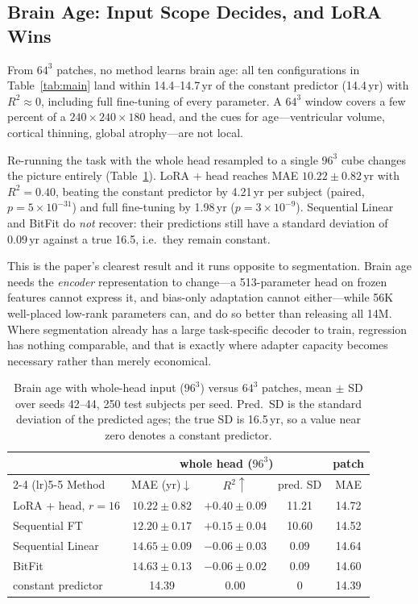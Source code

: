 \documentclass[journal,twoside,web]{ieeecolor}
\begin{document}
\subsection{Brain Age: Input Scope Decides, and LoRA Wins}
\label{sec:res_age}

From $64^3$ patches, no method learns brain age: all ten configurations in Table~\ref{tab:main} land within 14.4--14.7\,yr of the constant predictor (14.4\,yr) with $R^2\approx 0$, including full fine-tuning of every parameter. A $64^3$ window covers a few percent of a $240{\times}240{\times}180$ head, and the cues for age---ventricular volume, cortical thinning, global atrophy---are not local.

Re-running the task with the whole head resampled to a single $96^3$ cube changes the picture entirely (Table~\ref{tab:age}). LoRA + head reaches MAE $10.22\pm0.82$\,yr with $R^2=0.40$, beating the constant predictor by 4.21\,yr per subject (paired, $p=5{\times}10^{-31}$) and full fine-tuning by 1.98\,yr ($p=3{\times}10^{-9}$). Sequential Linear and BitFit do \emph{not} recover: their predictions still have a standard deviation of 0.09\,yr against a true 16.5, i.e.\ they remain constant.

This is the paper's clearest result and it runs opposite to segmentation. Brain age needs the \emph{encoder} representation to change---a 513-parameter head on frozen features cannot express it, and bias-only adaptation cannot either---while 56K well-placed low-rank parameters can, and do so better than releasing all 14M. Where segmentation already has a large task-specific decoder to train, regression has nothing comparable, and that is exactly where adapter capacity becomes necessary rather than merely economical.

\begin{table}[t]
\caption{Brain age with whole-head input ($96^3$) versus $64^3$ patches, mean $\pm$ SD over seeds 42--44, 250 test subjects per seed. Pred.\ SD is the standard deviation of the predicted ages; the true SD is 16.5\,yr, so a value near zero denotes a constant predictor.}
\label{tab:age}
\centering
\footnotesize
\setlength{\tabcolsep}{3pt}
\begin{tabular}{lcccc}
\toprule
 & \multicolumn{3}{c}{whole head ($96^3$)} & patch \\
\cmidrule(lr){2-4} \cmidrule(lr){5-5}
Method & MAE (yr)$\downarrow$ & $R^2\uparrow$ & pred. SD & MAE \\
\midrule
LoRA + head, $r{=}16$ & $\mathbf{10.22{\pm}0.82}$ & $\mathbf{+0.40{\pm}0.09}$ & 11.21 & 14.72 \\
Sequential FT         & $12.20{\pm}0.17$ & $+0.15{\pm}0.04$ & 10.60 & 14.52 \\
Sequential Linear     & $14.65{\pm}0.09$ & $-0.06{\pm}0.03$ & 0.09 & 14.64 \\
BitFit                & $14.63{\pm}0.13$ & $-0.06{\pm}0.02$ & 0.09 & 14.60 \\
\midrule
constant predictor    & 14.39 & 0.00 & 0 & 14.39 \\
\bottomrule
\end{tabular}
\end{table}
\end{document}
